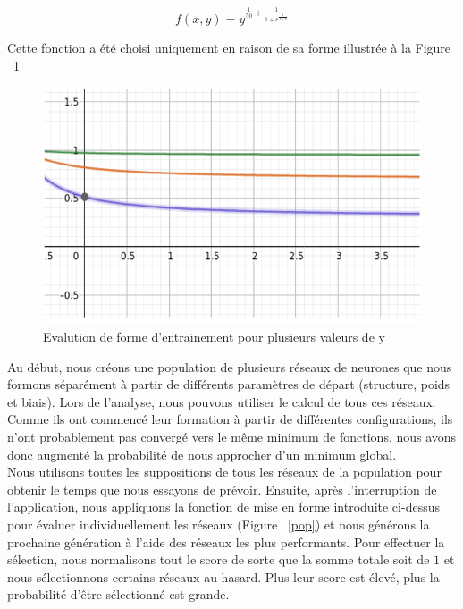 \documentclass[10pt,a4paper,oneside]{article}
\begin{document}
\begin{multicols}{2}
\vspace{0.8cm}

\begin{Large}
\[ f(x, y) = y^{\frac{1}{50}+\frac{1}{1+e^{\frac{1}{1+x}}}} \]
\end{Large}

\vspace{0.8cm}

Cette fonction a été choisi uniquement en raison de sa forme illustrée à la Figure ~\ref{fonction}

\end{multicols}

\vspace{0.8cm}

\begin{figure}[!ht]
\centering
\includegraphics[scale=0.5]{./images/fitness.png}
\caption{Evalution de forme d'entrainement pour plusieurs valeurs de y}
\label{fonction}
\end{figure}

\vspace{0.8cm}

\begin{multicols}{2}
Au début, nous créons une population de plusieurs réseaux de neurones que nous formons séparément à partir de différents paramètres de départ (structure, poids et biais). Lors de l'analyse, nous pouvons utiliser le calcul de tous ces réseaux. Comme ils ont commencé leur formation à partir de différentes configurations, ils n’ont probablement pas convergé vers le même minimum de fonctions, nous avons donc augmenté la probabilité de nous approcher d’un minimum global.
\\
Nous utilisons toutes les suppositions de tous les réseaux de la population pour obtenir le temps que nous essayons de prévoir. Ensuite, après l’interruption de l’application, nous appliquons la fonction de mise en forme introduite ci-dessus pour évaluer individuellement les réseaux (Figure ~\ref{pop}) et nous générons la prochaine génération à l’aide des réseaux les plus performants. Pour effectuer la sélection, nous normalisons tout le score de sorte que la somme totale soit de $1$ et nous sélectionnons certains réseaux au hasard. Plus leur score est élevé, plus la probabilité d'être sélectionné est grande.
\end{multicols}
\end{document}
